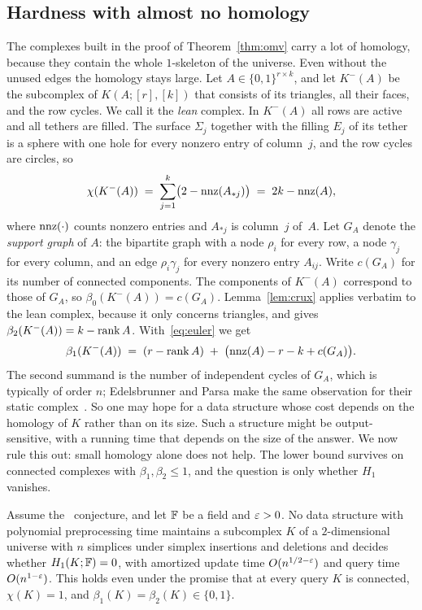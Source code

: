 \subsection{Hardness with almost no homology}\label{sec:acyclic}

The complexes built in the proof of Theorem~\ref{thm:omv} carry a lot of homology, because they contain the whole $1$-skeleton of the universe.
Even without the unused edges the homology stays large.
Let $A\in\{0,1\}^{r\times k}$, and let $K^-(A)$ be the subcomplex of $K(A;[r],[k])$ that consists of its triangles, all their faces, and the row cycles.
We call it the \emph{lean} complex.
In $K^-(A)$ all rows are active and all tethers are filled.
The surface $\Sigma_j$ together with the filling $E_j$ of its tether is a sphere with one hole for every nonzero entry of column~$j$, and the row cycles are circles, so
\begin{equation}\label{eq:euler-KA}
  \chi(K^-(A))\;=\;\sum_{j=1}^{k}\bigl(2-\operatorname{nnz}(A_{\ast j})\bigr)\;=\;2k-\operatorname{nnz}(A),
\end{equation}
where $\operatorname{nnz}(\cdot)$ counts nonzero entries and $A_{\ast j}$ is column~$j$ of~$A$.
Let $G_A$ denote the \emph{support graph} of $A$: the bipartite graph with a node $\rho_i$ for every row, a node $\gamma_j$ for every column, and an edge $\rho_i\gamma_j$ for every nonzero entry $A_{ij}$.
Write $c(G_A)$ for its number of connected components.
The components of $K^-(A)$ correspond to those of $G_A$, so \mbox{$\beta_0(K^-(A))=c(G_A)$}.
Lemma~\ref{lem:crux} applies verbatim to the lean complex, because it only concerns triangles, and gives $\beta_2(K^-(A))=k-\operatorname{rank} A$.
With~\eqref{eq:euler} we get
\begin{equation}\label{eq:betti1-KA}
  \beta_1(K^-(A))\;=\;(r-\operatorname{rank} A)\;+\;\bigl(\operatorname{nnz}(A)-r-k+c(G_A)\bigr).
\end{equation}
The second summand is the number of independent cycles of $G_A$, which is typically of order $n$; Edelsbrunner and Parsa make the same observation for their static complex~\cite[Remark~(2) after Theorem~3.1]{EP14}.
So one may hope for a data structure whose cost depends on the homology of $K$ rather than on its size.
Such a structure might be output-sensitive, with a running time that depends on the size of the answer.
We now rule this out: small homology alone does not help.
The lower bound survives on connected complexes with $\beta_1,\beta_2\le1$, and the question is only whether $H_1$ vanishes.

\begin{theorem}\label{thm:acyclic}
Assume the \OMv\ conjecture, and let $\mathbb{F}$ be a field and $\varepsilon>0$.
No data structure with polynomial preprocessing time maintains a subcomplex $K$ of a $2$-dimensional universe with $n$ simplices under simplex insertions and deletions and decides whether $H_1(K;\mathbb{F})=0$, with amortized update time $O(n^{1/2-\varepsilon})$ and query time $O(n^{1-\varepsilon})$.
This holds even under the promise that at every query $K$ is connected, $\chi(K)=1$, and $\beta_1(K)=\beta_2(K)\in\{0,1\}$.
\end{theorem}

